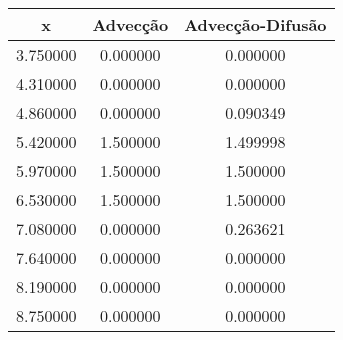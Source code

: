 \begin{tabular}{ccc}
\toprule
x & Advecção & Advecção-Difusão \\
\midrule
3.750000 & 0.000000 & 0.000000 \\
4.310000 & 0.000000 & 0.000000 \\
4.860000 & 0.000000 & 0.090349 \\
5.420000 & 1.500000 & 1.499998 \\
5.970000 & 1.500000 & 1.500000 \\
6.530000 & 1.500000 & 1.500000 \\
7.080000 & 0.000000 & 0.263621 \\
7.640000 & 0.000000 & 0.000000 \\
8.190000 & 0.000000 & 0.000000 \\
8.750000 & 0.000000 & 0.000000 \\
\bottomrule
\end{tabular}
